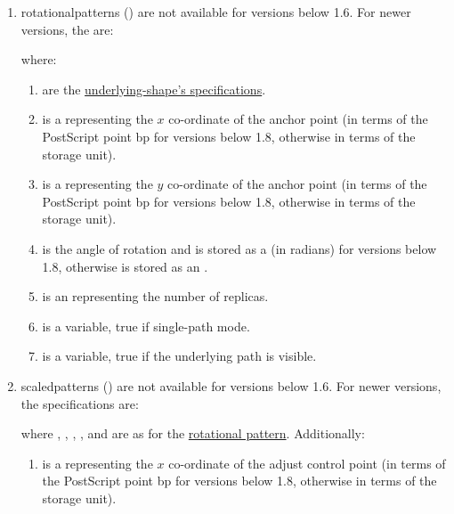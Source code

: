 \begin{numbered}
\begin{enumerate}
  \item\label{jdr:rotational}%
  \Glspl{rotationalpattern} () are not available for versions below 1.6.
  For newer versions, the  are:
  \begin{syntaxline}
     
    
  \end{syntaxline}
  where:
  \begin{enumerate}
  \item {} are the \hyperref[jdr:composite]{underlying-shape's
    specifications}.

  \item {} is a  representing the
    $x$ \gls{co-ordinate} of the anchor point (in terms of the PostScript point
    \gls*{bp} for versions below 1.8, otherwise in terms of the
    storage unit).

  \item {} is a  representing the
    $y$ \gls{co-ordinate} of the anchor point (in terms of the PostScript point
    \gls*{bp} for versions below 1.8, otherwise in terms of the
    storage unit).

  \item {} is the angle of rotation and is stored as a
   (in radians) for versions below 1.8, otherwise is
  stored as an .

  \item {} is an  representing the number
    of replicas.

  \item {} is a  variable, true if single-path mode.

  \item {} is a  variable, true if the underlying
    path is visible.
  \end{enumerate}%

  \item\label{jdr:scaled}%
  \Glspl{scaledpattern} () are not available for versions below 1.6.
  For newer versions, the specifications are:
  \begin{syntaxline}
     
      
  \end{syntaxline}
  where , , ,
  ,  and  are as for the
  \hyperref[jdr:rotational]{rotational pattern}. Additionally:
    \begin{enumerate}
    \item {} is a  representing the
    $x$ \gls{co-ordinate} of the adjust control point (in terms of the
    PostScript point \gls{bp} for versions below 1.8, otherwise in terms
    of the storage unit).


\end{enumerate}
\end{enumerate}
\end{numbered}
